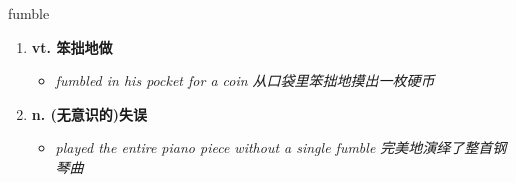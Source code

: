 
\begin{frame}
{\huge fumble}
\begin{center}
\begin{enumerate}\Large
  \item \textbf{vt. 笨拙地做}
  \begin{itemize}
    \item \em{\Large{fumbled in his pocket for a coin 从口袋里笨拙地摸出一枚硬币}}
  \end{itemize}
  \item \textbf{n. (无意识的)失误}
  \begin{itemize}
    \item \em{\Large{played the entire piano piece without a single fumble 完美地演绎了整首钢琴曲}}
  \end{itemize}
\end{enumerate}
\end{center}
\end{frame}
